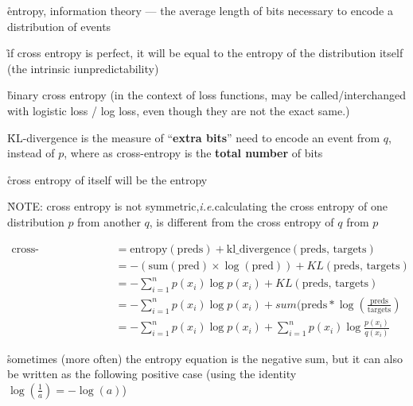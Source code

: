 \r{entropy, information theory --- the average length of bits necessary to encode a distribution of events}

\r{if cross entropy is perfect, it will be equal to the entropy of the distribution itself (the intrinsic iunpredictability)}

\r{binary cross entropy (in the context of loss functions, may be called/interchanged with logistic loss / log loss, even though they are not the exact same.)}

\r{KL-divergence is the measure of ``\textbf{extra bits}'' need to encode an event from $q$, instead of $p$, where as cross-entropy is the \textbf{total number} of bits}

\r{cross entropy of itself will be the entropy}

\r{NOTE: cross entropy is not symmetric,\textit{i.e.}calculating the cross entropy of one distribution $p$ from another $q$, is different from the cross entropy of $q$ from $p$}


 


\begin{equation}
	\begin{split}
		\textrm{cross-entropy(preds, targets) } & =  \textrm{entropy} (\textrm{preds}) + \textrm{kl\_divergence}(\textrm{preds, targets})\\
		& = -(\textrm{sum}(\textrm{pred}) \times \log (\textrm{pred}) )+ KL(\textrm{preds, targets})\\
		& =  -\sum_{i=1}^{n}p(x_i)\log p(x_i)+ KL(\textrm{preds, targets}) \\
		& =  -\sum_{i=1}^{n}p(x_i)\log p(x_i)+ sum(\textrm{preds} * \log ( \frac{\textrm{preds}}{\textrm{targets}} ) \\
		& =  -\sum_{i=1}^{n}p(x_i)\log p(x_i)+ \sum_{i=1}^{n}p(x_i)\log \frac{p(x_i)}{q(x_i)} 
	\end{split}
\end{equation}

\r{sometimes (more often) the entropy equation is the negative sum, but it can also be written as the following positive case (using the identity $ \log ( \frac{1}{a} )  = - \log (a) $)}

